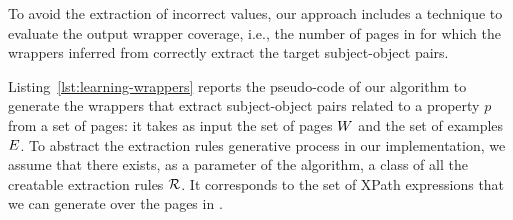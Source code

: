 

To avoid the extraction of incorrect values, our approach includes a technique to evaluate the output wrapper coverage, i.e., the number of pages in {\allpages} for which the wrappers inferred from {\somepages} correctly extract the target subject-object pairs. 


Listing~\ref{lst:learning-wrappers} reports the pseudo-code of our algorithm to generate the wrappers that extract subject-object pairs related to a property $p$ from a set of pages: 
%
it takes as input the set of pages $\mbox{\ensuremath{W}}$ and the set of examples ${\mbox{\ensuremath{E}}}$.
To abstract the extraction rules generative process in our implementation, we assume that there exists, as a parameter of the algorithm, a class of all the creatable extraction rules $\mathcal{R}$. It corresponds to the set of XPath expressions that we can generate over the pages in \allpages.

